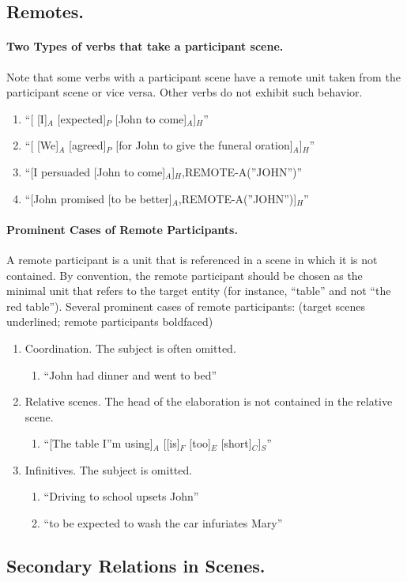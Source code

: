 \documentclass[11pt]{article}
\newcommand{\be}{\begin{enumerate}}
\newcommand{\ee}{\end{enumerate}}
\begin{document}
\subsection*{Remotes.}

\paragraph{Two Types of verbs that take a participant scene.} Note that some verbs with a participant scene have a remote unit taken from the participant scene or vice versa. Other verbs do not exhibit such behavior.
\be
\item
``[ [I]$_A$ [expected]$_P$ [John to come]$_A$]$_H$''
\item
``[ [We]$_A$ [agreed]$_P$ [for John to give the funeral oration]$_A$]$_H$''
\item
``[I persuaded [John to come]$_A$]$_H$,REMOTE-A(''JOHN'')''
\item
``[John promised [to be better]$_A$,REMOTE-A(''JOHN'')]$_H$''
\ee

\paragraph{
Prominent Cases of Remote Participants.} A remote participant is a unit that is referenced in a scene in which it is not contained. By convention, the remote participant should be chosen as the minimal unit that refers to the target entity (for instance, ``table'' and not ``the red table''). Several prominent cases of remote participants: (target scenes underlined; remote participants boldfaced)
\be
\item
Coordination. The subject is often omitted.
\be \item ``John had dinner and went to bed'' \ee
\item
Relative scenes. The head of the elaboration is not contained in the relative scene.
\be \item ``[The table I''m using]$_A$ [[is]$_F$ [too]$_E$ [short]$_C$]$_S$'' \ee
\item
Infinitives. The subject is omitted.
\be \item ``Driving to school upsets John''
\item ``to be expected to wash the car infuriates Mary''
\ee
\ee

\subsection*{Secondary Relations in Scenes.}
\end{document}
